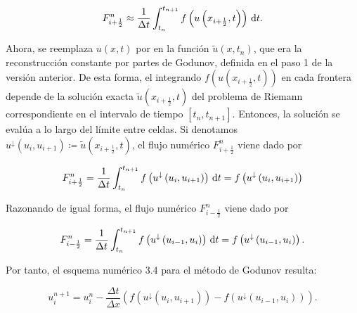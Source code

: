 \begin{equation*}
  F^{n}_{i+\frac{1}{2}}\approx
  \frac{1}{\Delta t}
  \int_{t_{n}}^{t_{n+1}}
  f\left(u\left(x_{i+\frac{1}{2}},t\right)\right)
  \dl t.
\end{equation*}

Ahora, se reemplaza $u\left(x,t\right)$ por en la función
$\widetilde{u}\left(x,t_{n}\right)$, que era la reconstrucción
constante por partes de Godunov, definida en el paso 1 de la versión
anterior.
De esta forma, el integrando
\begin{math}
  f
  \left(
  u
  \left(
    x_{i+\frac{1}{2}},
    t
    \right)
  \right)
\end{math}
en cada frontera depende de la solución exacta
\begin{math}
  \widetilde{u}
  \left(
  x_{i+\frac{1}{2}},t
  \right)
\end{math}
del problema de Riemann correspondiente en el intervalo de tiempo
\begin{math}
  \left[
    t_{n},
    t_{n+1}
    \right]
\end{math}.
Entonces, la solución se evalúa a lo largo del límite entre celdas.
Si denotamos
\begin{math}
  u^{\downarrow}
  \left(u_{i},u_{i+1}\right)\coloneqq
  \widetilde{u}
  \left(
  x_{i+\frac{1}{2}},
  t
  \right)
\end{math},
el flujo numérico $F^{n}_{i+\frac{1}{2}}$ viene dado por

\begin{equation*}
  F^{n}_{i+\frac{1}{2}}=
  \frac{1}{\Delta t}
  \int_{t_{n}}^{t_{n+1}}
  f
  \left(
  u^{\downarrow}
  \left(u_{i},u_{i+1}\right)
  \right)
  \dl t=
  f
  \left(
  u^{\downarrow}
  \left(u_{i},u_{i+1}\right)
  \right)
\end{equation*}

Razonando de igual forma, el flujo numérico $F^{n}_{i-\frac{1}{2}}$
viene dado por

\begin{equation*}
  F_{i-\frac{1}{2}}^{n}=
  \frac{1}{\Delta t}
  \int_{t_{n}}^{t_{n+1}}
  f
  \left(
  u^{\downarrow}
  \left(u_{i-1},u_{i}\right)
  \right)
  \dl t=
  f
  \left(
  u^{\downarrow}
  \left(u_{i-1},u_{i}\right)
  \right).
\end{equation*}

Por tanto, el esquema numérico 3.4 para el método de Godunov resulta:

\begin{equation*}
  u^{n+1}_{i}=
  u^{n}_{i}-
  \frac{\Delta t}{\Delta x}
  \left(
  f
  \left(
    u^{\downarrow}
    \left(u_{i},u_{i+1}\right)
    \right)-
  f
  \left(
    u^{\downarrow}
    \left(u_{i-1},u_{i}\right)
    \right)
  \right).
\end{equation*}

